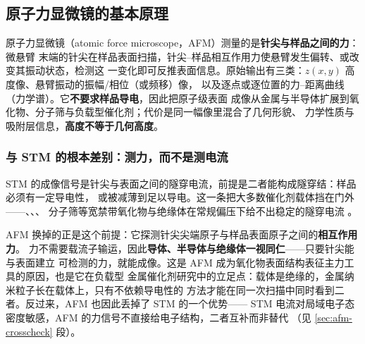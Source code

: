 
\subsection{原子力显微镜的基本原理}
\label{sec:afm-principle}

\begin{probout}
原子力显微镜（atomic force microscope，AFM）测量的是\textbf{针尖与样品之间的力}：微悬臂
末端的针尖在样品表面扫描，针尖--样品相互作用力使悬臂发生偏转、或改变其振动状态，检测这
一变化即可反推表面信息。原始输出有三类：$z(x,y)$ 高度像、悬臂振动的振幅/相位（或频移）像，
以及逐点或逐位置的力--距离曲线（力学谱）。它\textbf{不要求样品导电}，因此把原子级表面
成像从金属与半导体扩展到氧化物、分子筛与负载型催化剂；代价是同一幅像里混合了几何形貌、
力学性质与吸附层信息，\textbf{高度不等于几何高度}。
\end{probout}

\subsubsection{与 STM 的根本差别：测力，而不是测电流}

STM 的成像信号是针尖与表面之间的隧穿电流，前提是二者能构成隧穿结：样品必须有一定导电性，
或被减薄到足以导电。这一条把大多数催化剂载体挡在门外——、、、
分子筛等宽禁带氧化物与绝缘体在常规偏压下给不出稳定的隧穿电流
。

AFM 换掉的正是这个前提：它探测针尖尖端原子与样品表面原子之间的\textbf{相互作用力}。
力不需要载流子输运，因此\textbf{导体、半导体与绝缘体一视同仁}——只要针尖能与表面建立
可检测的力，就能成像。这是 AFM 成为氧化物表面结构表征主力工具的原因，也是它在负载型
金属催化剂研究中的立足点：载体是绝缘的，金属纳米粒子长在载体上，只有不依赖导电性的
方法才能在同一次扫描中同时看到二者。反过来，AFM 也因此丢掉了 STM 的一个优势——
STM 电流对局域电子态密度敏感，AFM 的力信号不直接给电子结构，二者互补而非替代
（见 \ref{sec:afm-crosscheck} 段）。

